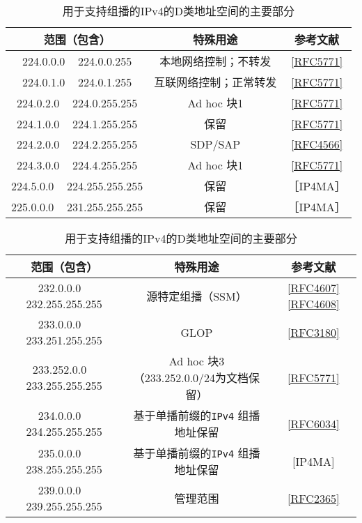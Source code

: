\begin{table}[H]
    \centering
    \caption{用于支持组播的IPv4的D类地址空间的主要部分}
    \begin{tabular}{c|c|c}
        \hline
        范围（包含）	              &	特殊用途	            &	参考文献  \\ \hline
        224.0.0.0 ~ 224.0.0.255	    &	本地网络控制；不转发	&	\href{https://www.rfc-editor.org/rfc/rfc5771}{[RFC5771]}  \\ \hline
        224.0.1.0 ~ 224.0.1.255	    &	互联网络控制；正常转发	&	\href{https://www.rfc-editor.org/rfc/rfc5771}{[RFC5771]}  \\ \hline
        224.0.2.0 ~ 224.0.255.255	&	Ad hoc 块1	        &	\href{https://www.rfc-editor.org/rfc/rfc5771}{[RFC5771]}  \\ \hline
        224.1.0.0 ~ 224.1.255.255	&	保留	            &	\href{https://www.rfc-editor.org/rfc/rfc5771}{[RFC5771]}  \\ \hline
        224.2.0.0 ~ 224.2.255.255	&	SDP/SAP	           &	\href{https://www.rfc-editor.org/rfc/rfc4566}{[RFC4566]}  \\ \hline
        224.3.0.0 ~ 224.4.255.255	&	Ad hoc 块1	        &	\href{https://www.rfc-editor.org/rfc/rfc5771}{[RFC5771]}  \\ \hline
        224.5.0.0 ~ 224.255.255.255	&	保留	            &	［IP4MA］  \\ \hline
        225.0.0.0 ~ 231.255.255.255	&	保留	            &	［IP4MA］  \\ \hline
    \end{tabular}
\end{table}

\begin{table}[H]
    \centering
    \caption{用于支持组播的IPv4的D类地址空间的主要部分}
    \begin{tabular}{c|c|c}
        \hline
        范围（包含）	              &	特殊用途	            &	参考文献  \\ \hline
        232.0.0.0 ~ 232.255.255.255	    &	源特定组播（SSM）	&	\href{https://www.rfc-editor.org/rfc/rfc4607}{[RFC4607]}\href{https://www.rfc-editor.org/rfc/rfc4608}{[RFC4608]}  \\ \hline
        233.0.0.0 ~ 233.251.255.255	    &	GLOP	&	\href{https://www.rfc-editor.org/rfc/rfc3180}{[RFC3180]}  \\ \hline
        233.252.0.0 ~ 233.255.255.255	&	Ad hoc 块3（233.252.0.0/24为文档保留）  &	\href{https://www.rfc-editor.org/rfc/rfc5771}{[RFC5771]}  \\ \hline
        234.0.0.0 ~ 234.255.255.255	    &	基于单播前缀的\verb|IPv4| 组播地址保留  &	\href{https://www.rfc-editor.org/rfc/rfc6034}{[RFC6034]}  \\ \hline
        235.0.0.0 ~ 238.255.255.255	    &	基于单播前缀的\verb|IPv4| 组播地址保留  &	[IP4MA]  \\ \hline
        239.0.0.0 ~ 239.255.255.255	    &	管理范围    &	\href{https://www.rfc-editor.org/rfc/rfc2365}{[RFC2365]}  \\ \hline
    \end{tabular}
\end{table}

